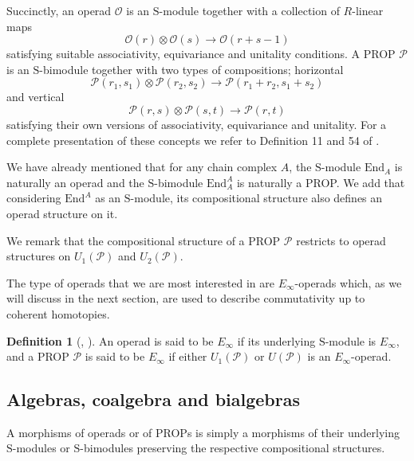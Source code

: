 \documentclass[A4]{amsart}
\theoremstyle{definition}
\newtheorem{definition}[theorem]{Definition}
\newcommand{\End}{\mathrm{End}}
\begin{document}
Succinctly, an operad $\mathcal O$ is an $\mathrm{S}$-module together with a collection of $R$-linear maps
\begin{equation*}
\mathcal O(r) \otimes \mathcal O(s) \to \mathcal O(r+s-1)
\end{equation*}
satisfying suitable associativity, equivariance and unitality conditions. A PROP $\mathcal P$ is an $\mathrm{S}$-bimodule together with two types of compositions; horizontal
\begin{equation*}
\mathcal P(r_1, s_1) \otimes \mathcal P(r_2, s_2) \to \mathcal P(r_1 + r_2, s_1 + s_2)
\end{equation*}
and vertical
\begin{equation*}
\mathcal P(r,s) \otimes \mathcal P(s, t) \to \mathcal P(r, t)
\end{equation*}
satisfying their own versions of associativity, equivariance and unitality. For a complete presentation of these concepts we refer to Definition 11 and 54 of \cite{markl2008operads}.

We have already mentioned that for any chain complex $A$, the $\mathrm{S}$-module $\End_A$ is naturally an operad and the $\mathrm{S}$-bimodule $\End_A^A$ is naturally a PROP. We add that considering $\End^A$ as an $\mathrm{S}$-module, its compositional structure also defines an operad structure on it.

We remark that the compositional structure of a PROP $\mathcal P$ restricts to operad structures on $U_1(\mathcal P)$ and $U_2(\mathcal P)$.

The type of operads that we are most interested in are $E_\infty$-operads which, as we will discuss in the next section, are used to describe commutativity up to coherent homotopies.

\begin{definition} [\cite{may72geometry}, \cite{boardman1973homotopy}]
	An operad is said to be $E_\infty$ if its underlying \mbox{$\mathrm{S}$-module} is $E_\infty$, and a PROP $\mathcal P$ is said to be $E_\infty$ if either $U_1(\mathcal P)$ or $U(\mathcal P)$ is an \mbox{$E_\infty$-operad}.
\end{definition}

\subsection{Algebras, coalgebra and bialgebras}

A morphisms of operads or of PROPs is simply a morphisms of their underlying $\mathrm{S}$-modules or $\mathrm{S}$-bimodules preserving the respective compositional structures.
\end{document}

